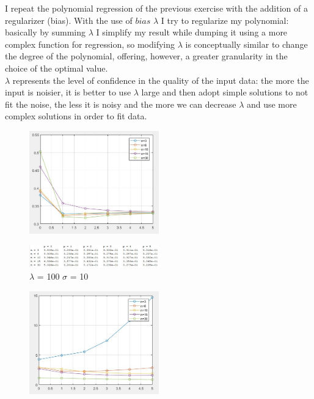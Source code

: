 I repeat the polynomial regression of the previous exercise with the addition of a regularizer (bias). With the use of $bias$ $\lambda$ I try to regularize my polynomial: basically by summing $\lambda$ I simplify my result while dumping it using a more complex function for regression, so modifying $\lambda$ is conceptually similar to change the degree of the polynomial, offering, however, a greater granularity in the choice of the optimal value.\\
$\lambda$ represents the level of confidence in the quality of the input data: the more the input is noisier, it is better to use $\lambda$ large and then adopt simple solutions to not fit the noise, the less it is noisy and the more we can decrease $\lambda$ and use more complex solutions in order to fit data.\\

\begin{figure}[h]
	\centering
	\includegraphics[width=0.5\textwidth]{pl100s10.png}
\end{figure}

\begin{figure}[h]
	\centering
	\includegraphics[width=0.5\textwidth]{tl100s10.png}
	\caption{$\lambda$ = 100 $\sigma$ = 10}
	\label{fig:lambda = 100 sigma = 10}
\end{figure}

\begin{figure}[h]
	\centering
	\includegraphics[width=0.5\textwidth]{pl0001s10.png}
\end{figure}

